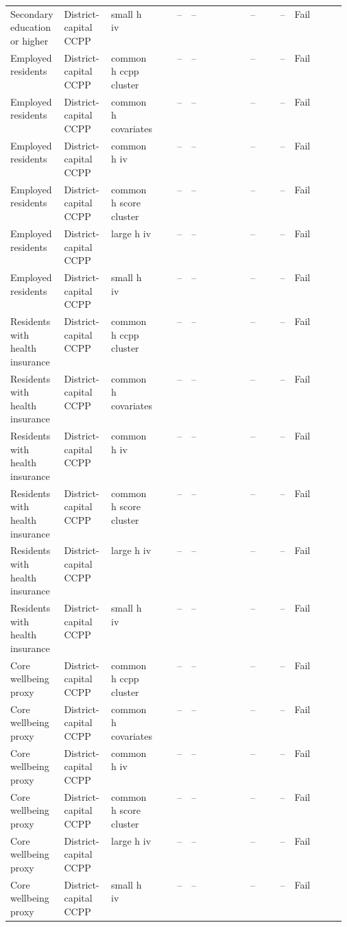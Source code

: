 \begin{longtable}{@{}p{0.16\linewidth}p{0.14\linewidth}p{0.14\linewidth}rp{0.13\linewidth}rrl@{}}
Secondary education or higher & District-capital CCPP & small h iv & -- & -- & -- & -- & Fail \\
Employed residents & District-capital CCPP & common h ccpp cluster & -- & -- & -- & -- & Fail \\
Employed residents & District-capital CCPP & common h covariates & -- & -- & -- & -- & Fail \\
Employed residents & District-capital CCPP & common h iv & -- & -- & -- & -- & Fail \\
Employed residents & District-capital CCPP & common h score cluster & -- & -- & -- & -- & Fail \\
Employed residents & District-capital CCPP & large h iv & -- & -- & -- & -- & Fail \\
Employed residents & District-capital CCPP & small h iv & -- & -- & -- & -- & Fail \\
Residents with health insurance & District-capital CCPP & common h ccpp cluster & -- & -- & -- & -- & Fail \\
Residents with health insurance & District-capital CCPP & common h covariates & -- & -- & -- & -- & Fail \\
Residents with health insurance & District-capital CCPP & common h iv & -- & -- & -- & -- & Fail \\
Residents with health insurance & District-capital CCPP & common h score cluster & -- & -- & -- & -- & Fail \\
Residents with health insurance & District-capital CCPP & large h iv & -- & -- & -- & -- & Fail \\
Residents with health insurance & District-capital CCPP & small h iv & -- & -- & -- & -- & Fail \\
Core wellbeing proxy & District-capital CCPP & common h ccpp cluster & -- & -- & -- & -- & Fail \\
Core wellbeing proxy & District-capital CCPP & common h covariates & -- & -- & -- & -- & Fail \\
Core wellbeing proxy & District-capital CCPP & common h iv & -- & -- & -- & -- & Fail \\
Core wellbeing proxy & District-capital CCPP & common h score cluster & -- & -- & -- & -- & Fail \\
Core wellbeing proxy & District-capital CCPP & large h iv & -- & -- & -- & -- & Fail \\
Core wellbeing proxy & District-capital CCPP & small h iv & -- & -- & -- & -- & Fail \\
\end{longtable}
\endgroup
